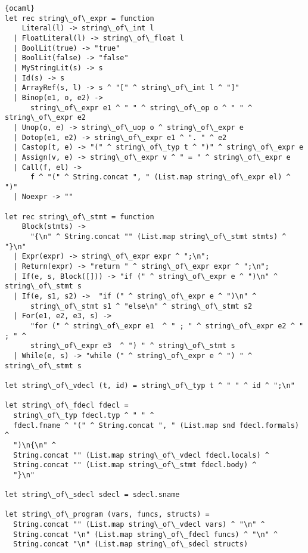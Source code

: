 \begin{lstlisting}{ocaml}
let rec string\_of\_expr = function
    Literal(l) -> string\_of\_int l
  | FloatLiteral(l) -> string\_of\_float l
  | BoolLit(true) -> "true"
  | BoolLit(false) -> "false"
  | MyStringLit(s) -> s
  | Id(s) -> s
  | ArrayRef(s, l) -> s ^ "[" ^ string\_of\_int l ^ "]"
  | Binop(e1, o, e2) ->
      string\_of\_expr e1 ^ " " ^ string\_of\_op o ^ " " ^ string\_of\_expr e2
  | Unop(o, e) -> string\_of\_uop o ^ string\_of\_expr e
  | Dotop(e1, e2) -> string\_of\_expr e1 ^ ". " ^ e2
  | Castop(t, e) -> "(" ^ string\_of\_typ t ^ ")" ^ string\_of\_expr e
  | Assign(v, e) -> string\_of\_expr v ^ " = " ^ string\_of\_expr e
  | Call(f, el) ->
      f ^ "(" ^ String.concat ", " (List.map string\_of\_expr el) ^ ")"
  | Noexpr -> ""

let rec string\_of\_stmt = function
    Block(stmts) ->
      "{\n" ^ String.concat "" (List.map string\_of\_stmt stmts) ^ "}\n"
  | Expr(expr) -> string\_of\_expr expr ^ ";\n";
  | Return(expr) -> "return " ^ string\_of\_expr expr ^ ";\n";
  | If(e, s, Block([])) -> "if (" ^ string\_of\_expr e ^ ")\n" ^ string\_of\_stmt s
  | If(e, s1, s2) ->  "if (" ^ string\_of\_expr e ^ ")\n" ^
      string\_of\_stmt s1 ^ "else\n" ^ string\_of\_stmt s2
  | For(e1, e2, e3, s) ->
      "for (" ^ string\_of\_expr e1  ^ " ; " ^ string\_of\_expr e2 ^ " ; " ^
      string\_of\_expr e3  ^ ") " ^ string\_of\_stmt s
  | While(e, s) -> "while (" ^ string\_of\_expr e ^ ") " ^ string\_of\_stmt s

let string\_of\_vdecl (t, id) = string\_of\_typ t ^ " " ^ id ^ ";\n"

let string\_of\_fdecl fdecl =
  string\_of\_typ fdecl.typ ^ " " ^
  fdecl.fname ^ "(" ^ String.concat ", " (List.map snd fdecl.formals) ^
  ")\n{\n" ^
  String.concat "" (List.map string\_of\_vdecl fdecl.locals) ^
  String.concat "" (List.map string\_of\_stmt fdecl.body) ^
  "}\n"

let string\_of\_sdecl sdecl = sdecl.sname

let string\_of\_program (vars, funcs, structs) =
  String.concat "" (List.map string\_of\_vdecl vars) ^ "\n" ^
  String.concat "\n" (List.map string\_of\_fdecl funcs) ^ "\n" ^
  String.concat "\n" (List.map string\_of\_sdecl structs)
\end{lstlisting}
